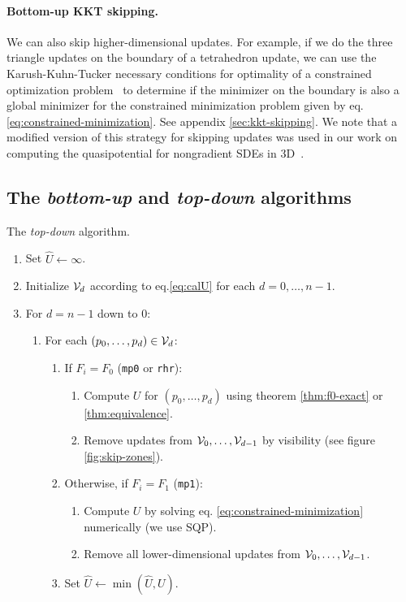 \documentclass[smallcondensed]{svjour3}
\begin{document}
\paragraph{Bottom-up KKT skipping.} We can also skip
higher-dimensional updates. For example, if we do the three triangle
updates on the boundary of a tetrahedron update, we can use the
Karush-Kuhn-Tucker necessary conditions for optimality of a
constrained optimization problem~\cite{nocedal2006numerical} to
determine if the minimizer on the boundary is also a global minimizer
for the constrained minimization problem given by eq.\@
\ref{eq:constrained-minimization}. See appendix\@
\ref{sec:kkt-skipping}. We note that a modified version of this
strategy for skipping updates was used in our work on computing the
quasipotential for nongradient SDEs in 3D~\cite{yang2019computing}.

\subsection{The \emph{bottom-up} and \emph{top-down} algorithms}\label{ssec:top-down-and-bottom-up}

\begin{algorithm}[t]
  \caption{The \emph{top-down} algorithm.}\label{alg:top-down}
  \begin{enumerate}[nolistsep]
  \item Set $\hat{U} \gets \infty$.
  \item Initialize $\mathcal{V}_d$ according to eq.\@ \ref{eq:calU} for
    each $d = 0, \hdots, n - 1$.
  \item For $d = n - 1$ down to $0$:
    \begin{enumerate}
    \item For each $(p_0, \hdots, p_d) \in \mathcal{V}_d$:
      \begin{enumerate}
      \item If $F_i = F_0$ (\texttt{mp0} or \texttt{rhr}):
        \begin{enumerate}
        \item Compute $U$ for $(p_0, \hdots, p_{d})$ using theorem
          \ref{thm:f0-exact} or \ref{thm:equivalence}.
        \item Remove updates from $\mathcal{V}_0, \hdots, \mathcal{V}_{d-1}$ by
          visibility (see figure \ref{fig:skip-zones}).
        \end{enumerate}
      \item Otherwise, if $F_i = F_1$ (\texttt{mp1}):
        \begin{enumerate}
        \item Compute $U$ by solving eq.\@
          \ref{eq:constrained-minimization} numerically (we use SQP).
        \item Remove all lower-dimensional updates from
          $\mathcal{V}_0, \hdots, \mathcal{V}_{d-1}$.
        \end{enumerate}
      \item Set $\hat{U} \gets \min(\hat{U}, U)$.
      \end{enumerate}
    \end{enumerate}
  \end{enumerate}
\end{algorithm}
\end{document}
